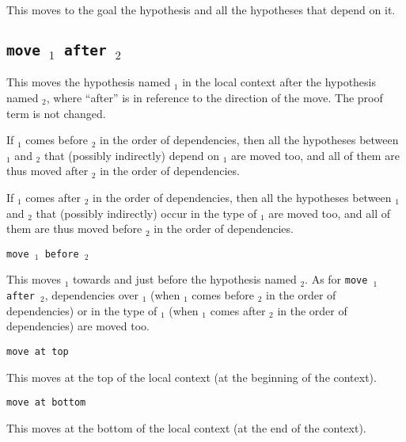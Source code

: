 \begin{coq_example*}
\begin{Variants}
 This moves to the goal the hypothesis {\ident} and all the hypotheses
 that depend on it.

\end{Variants}

\subsection{\tt move {\ident$_1$} after {\ident$_2$}}
\label{move}

This moves the hypothesis named {\ident$_1$} in the local context
after the hypothesis named {\ident$_2$}, where ``after'' is in
reference to the direction of the move. The proof term is not changed.

If {\ident$_1$} comes before {\ident$_2$} in the order of
dependencies, then all the hypotheses between {\ident$_1$} and
{\ident$_2$} that (possibly indirectly) depend on {\ident$_1$} are
moved too, and all of them are thus moved after {\ident$_2$} in the
order of dependencies.

If {\ident$_1$} comes after {\ident$_2$} in the order of dependencies,
then all the hypotheses between {\ident$_1$} and {\ident$_2$} that
(possibly indirectly) occur in the type of {\ident$_1$} are moved
too, and all of them are thus moved before {\ident$_2$} in the order
of dependencies.

\begin{Variants}

\item {\tt move {\ident$_1$} before {\ident$_2$}}

This moves {\ident$_1$} towards and just before the hypothesis named
{\ident$_2$}. As for {\tt move {\ident$_1$} after {\ident$_2$}},
dependencies over {\ident$_1$} (when {\ident$_1$} comes before
{\ident$_2$} in the order of dependencies) or in the type of
{\ident$_1$} (when {\ident$_1$} comes after {\ident$_2$} in the order
of dependencies) are moved too.

\item {\tt move {\ident} at top}

This moves {\ident} at the top of the local context (at the beginning of the context).

\item {\tt move {\ident} at bottom}

This moves {\ident} at the bottom of the local context (at the end of the context).

\end{Variants}


\end{coq_example*}
